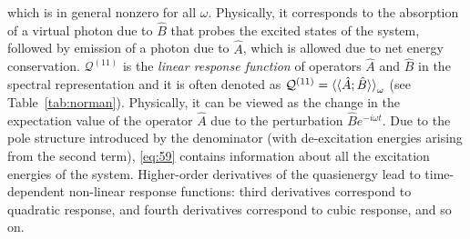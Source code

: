 \documentclass[%
class = book,%
crop = false,%
float = true,%
multi = true,%
preview = false,%
]{standalone}
\begin{document}
which is in general nonzero for all \(\omega\). Physically, it corresponds to the absorption of a virtual photon due to \(\hat{B}\) that probes the excited states of the system, followed by emission of a photon due to \(\hat{A}\), which is allowed due to net energy conservation. \(\mathcal{Q}^{(11)}\) is the \emph{linear response function} of operators \(\hat{A}\) and \(\hat{B}\) in the spectral representation and it is often denoted as \(\mathcal{Q}^{(11)} = \braket{\braket{\hat{A};\hat{B}}}_{\omega}\) (see Table~\ref{tab:norman}). Physically, it can be viewed as the change in the expectation value of the operator \(\hat{A}\) due to the perturbation \(\hat{B}e^{-i\omega t}\). Due to the pole structure introduced by the denominator (with de-excitation energies arising from the second term), \eqref{eq:59} contains information about all the excitation energies of the system. Higher-order derivatives of the quasienergy lead to time-dependent non-linear response functions: third derivatives correspond to quadratic response, and fourth derivatives correspond to cubic response, and so on.



\end{document}
